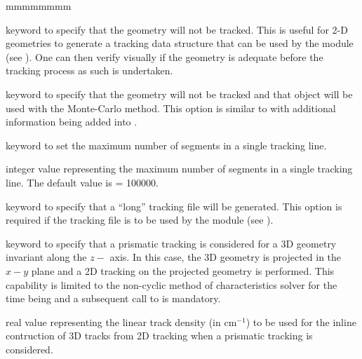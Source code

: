 \begin{ListeDeDescription}{mmmmmmmm}
\item[\moc{NOTR}] keyword to specify that the geometry will not be tracked. This is useful for 2-D geometries 
to generate a tracking data structure that can be used by the  module (see ). 
One can then verify visually if the geometry is adequate before the tracking process as such is 
undertaken.

\item[\moc{MC}] keyword to specify that the geometry will not be tracked and that object  will be used with the
Monte-Carlo method. This option is similar to  with additional information being added into .

\item[\moc{NBSLIN}] keyword to set the maximum number of segments in a single tracking line.

\item[\dusa{nbsl}] integer value representing the maximum number of segments in a single tracking line. The default value is  = 100000.

\item[\moc{LONG}] keyword to specify that a ``long'' tracking file will be generated. This option is required if the tracking file is to be used by the  module (see ).

\item[\moc{PRIZ}] keyword to specify that a prismatic tracking is considered for a 3D geometry invariant along the $z-$ axis. In this case, the 3D geometry is projected in the $x-y$ plane and a 2D tracking on the projected geometry is performed. This capability is limited to the non-cyclic method of characteristics solver for the time being and a subsequent call to  is mandatory.

\item[\dusa{denspr}] real value representing the linear track density (in cm$^{-1}$) to be used for the inline contruction of 3D tracks from 2D tracking when a prismatic tracking is considered.

\end{ListeDeDescription}
\clearpage

